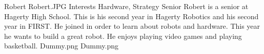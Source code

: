 {Robert}
{Robert.JPG}
{Interests}
{Hardware, Strategy}
{Senior}
{
Robert is a senior at Hagerty High School. This is his second year in Hagerty Robotics and his second year in FIRST. He joined in order to learn about robots and hardware. This year he wants to build a great robot. He enjoys playing video games and playing basketball.
}
{Dummy.png}
{Dummy.png}
